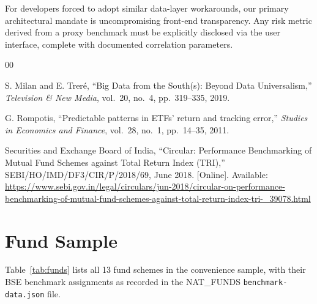 \documentclass[conference]{IEEEtran}
\begin{document}
For developers forced to adopt similar data-layer workarounds, our primary architectural mandate is uncompromising front-end transparency. Any risk metric derived from a proxy benchmark must be explicitly disclosed via the user interface, complete with documented correlation parameters.

\begin{thebibliography}{00}

S. Milan and E. Treré, ``Big Data from the South(s): Beyond Data Universalism,''
\textit{Television \& New Media}, vol.~20, no.~4, pp.~319--335, 2019.

G. Rompotis, ``Predictable patterns in ETFs' return and tracking error,''
\textit{Studies in Economics and Finance}, vol.~28, no.~1, pp.~14--35, 2011.

Securities and Exchange Board of India, ``Circular: Performance Benchmarking of
Mutual Fund Schemes against Total Return Index (TRI),''
SEBI/HO/IMD/DF3/CIR/P/2018/69, June 2018. [Online]. Available:
\url{https://www.sebi.gov.in/legal/circulars/jun-2018/circular-on-performance-benchmarking-of-mutual-fund-schemes-against-total-return-index-tri-_39078.html}

\end{thebibliography}

\appendix
\section{Fund Sample}
\label{app:funds}

Table~\ref{tab:funds} lists all 13 fund schemes in the convenience sample, with their BSE benchmark assignments as recorded in the NAT\_FUNDS \texttt{benchmark-data.json} file.
\end{document}
